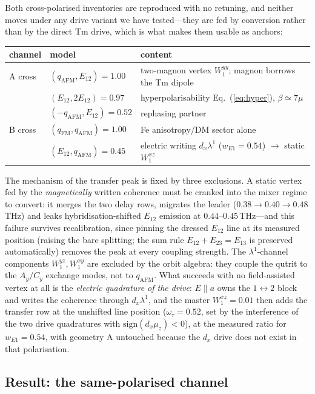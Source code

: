 \documentclass[11pt,a4paper]{article}
\newcommand{\qafm}{q_{\mathrm{AFM}}}
\newcommand{\qfm}{q_{\mathrm{FM}}}
\begin{document}
Both cross-polarised inventories are reproduced with no retuning, and
neither moves under any drive variant we have tested---they are fed by
conversion rather than by the direct Tm drive, which is what makes them
usable as anchors:
\begin{center}\small
\renewcommand{\arraystretch}{1.2}
\begin{tabular}{lll}
\toprule
channel & model & content\\
\midrule
A cross & $(\qafm,E_{12})=1.00$ & two-magnon vertex $W^{yy}_1$;
  magnon borrows the Tm dipole\\
 & $(E_{12},2E_{12})=0.97$ & hyperpolarisability
  Eq.~(\ref{eq:hyper}), $\beta\simeq7\mu$\\
 & $(-\qafm,E_{12})=0.52$ & rephasing partner\\
B cross & $(\qfm,\qafm)=1.00$ & Fe anisotropy/DM sector alone\\
 & $(E_{12},\qafm)=0.45$ & electric writing $d_x\lambda^1$
   ($w_{E1}=0.54$) $\to$ static $W^{xz}_1$\\
\bottomrule
\end{tabular}
\end{center}
The mechanism of the transfer peak is fixed by three exclusions.  A
static vertex fed by the \emph{magnetically} written coherence must be
cranked into the mixer regime to convert: it merges the two delay rows,
migrates the leader ($0.38\to0.40\to0.48$\,THz) and leaks
hybridisation-shifted $E_{12}$ emission at $0.44$--$0.45$\,THz---and this
failure survives recalibration, since pinning the dressed $E_{12}$ line
at its measured position (raising the bare splitting; the sum rule
$E_{12}{+}E_{23}{=}E_{13}$ is preserved automatically) removes the peak
at every coupling strength.  The $\lambda^1$-channel components
$W^{yz}_1,W^{xy}_1$ are excluded by the orbit algebra: they couple the
qutrit to the $A_y/C_y$ exchange modes, not to $\qafm$.  What succeeds
with no field-assisted vertex at all is the \emph{electric quadrature of
the drive}: $E\!\parallel\!a$ owns the $1\!\leftrightarrow\!2$ block and
writes the coherence through $d_x\lambda^1$, and the master
$W^{xz}_1=0.01$ then adds the transfer row at the unshifted line
position ($\omega_\tau=0.52$, set by the interference of the two drive
quadratures with $\mathrm{sign}(d_x\mu_z)<0$), at the measured ratio for
$w_{E1}=0.54$, with geometry A untouched because the $d_x$ drive does
not exist in that polarisation.

\subsection{Result: the same-polarised channel}
\label{sec:samepolfit}
\end{document}
